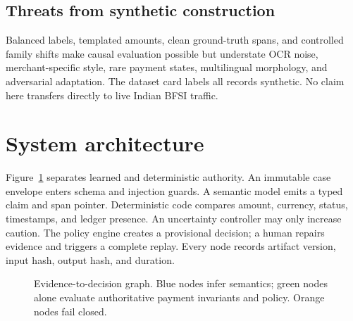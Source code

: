 \documentclass[10pt,twocolumn]{article}
\begin{document}
\subsection{Threats from synthetic construction}
Balanced labels, templated amounts, clean ground-truth spans, and controlled family shifts make causal evaluation possible but understate OCR noise, merchant-specific style, rare payment states, multilingual morphology, and adversarial adaptation. The dataset card labels all records synthetic. No claim here transfers directly to live Indian BFSI traffic.

\section{System architecture}
Figure~\ref{fig:architecture} separates learned and deterministic authority. An immutable case envelope enters schema and injection guards. A semantic model emits a typed claim and span pointer. Deterministic code compares amount, currency, status, timestamps, and ledger presence. An uncertainty controller may only increase caution. The policy engine creates a provisional decision; a human repairs evidence and triggers a complete replay. Every node records artifact version, input hash, output hash, and duration.

\begin{figure}[t]
\centering
{}
\caption{Evidence-to-decision graph. Blue nodes infer semantics; green nodes alone evaluate authoritative payment invariants and policy. Orange nodes fail closed.}
\label{fig:architecture}
\end{figure}
\end{document}
